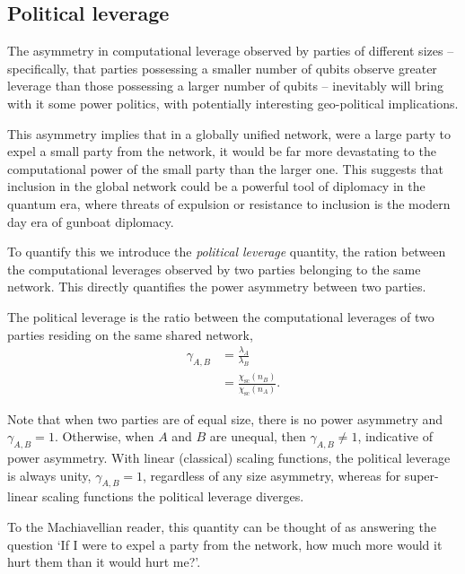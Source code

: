 %
%

\subsection{Political leverage}\label{sec:political_lev}

The asymmetry in computational leverage observed by parties of different sizes -- specifically, that parties possessing a smaller number of qubits observe greater leverage than those possessing a larger number of qubits -- inevitably will bring with it some power politics, with potentially interesting geo-political implications.

This asymmetry implies that in a globally unified network, were a large party to expel a small party from the network, it would be far more devastating to the computational power of the small party than the larger one. This suggests that inclusion in the global network could be a powerful tool of diplomacy in the quantum era, where threats of expulsion or resistance to inclusion is the modern day era of gunboat diplomacy.

To quantify this we introduce the \textit{political leverage} quantity, the ration between the computational leverages observed by two parties belonging to the same network. This directly quantifies the power asymmetry between two parties.

\begin{definition}
The political leverage is the ratio between the computational leverages of two parties residing on the same shared network,
\begin{align}
	\gamma_{A,B} &= \frac{\lambda_A}{\lambda_B}\nonumber\\
	&= \frac{\chi_\text{sc}(n_B)}{\chi_\text{sc}(n_A)}.
\end{align}
\end{definition}
Note that when two parties are of equal size, there is no power asymmetry and \mbox{$\gamma_{A,B}=1$}. Otherwise, when $A$ and $B$ are unequal, then \mbox{$\gamma_{A,B}\neq 1$}, indicative of power asymmetry. With linear (classical) scaling functions, the political leverage is always unity, \mbox{$\gamma_{A,B}=1$}, regardless of any size asymmetry, whereas for super-linear scaling functions the political leverage diverges.

To the Machiavellian reader, this quantity can be thought of as answering the question `If I were to expel a party from the network, how much more would it hurt them than it would hurt me?'.

